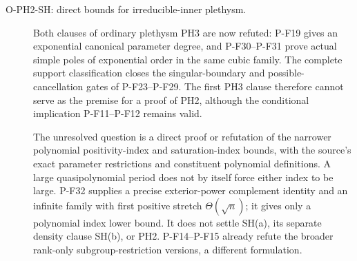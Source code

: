 \documentclass[11pt,a4paper]{article}
\begin{document}
\begin{description}
\item[O-PH2-SH: direct bounds for irreducible-inner plethysm.]
Both clauses of ordinary plethysm PH3 are now refuted: P-F19 gives
an exponential canonical parameter degree, and P-F30--P-F31 prove
actual simple poles of exponential order in the same cubic family.
The complete support classification closes the singular-boundary
and possible-cancellation gates of P-F23--P-F29. The first PH3
clause therefore cannot serve as the premise for a proof of PH2,
although the conditional implication P-F11--P-F12 remains valid.

The unresolved question is a direct proof or refutation of the
narrower polynomial positivity-index and saturation-index bounds,
with the source's exact parameter restrictions and constituent
polynomial definitions. A large quasipolynomial period does not by
itself force either index to be large. P-F32 supplies a precise
exterior-power complement identity and an infinite family with
first positive stretch $\Theta(\sqrt n)$; it gives only a polynomial
index lower bound. It does not settle SH(a), its separate density
clause SH(b), or PH2. P-F14--P-F15 already refute the broader
rank-only subgroup-restriction versions, a different formulation.


\end{description}
\end{document}
